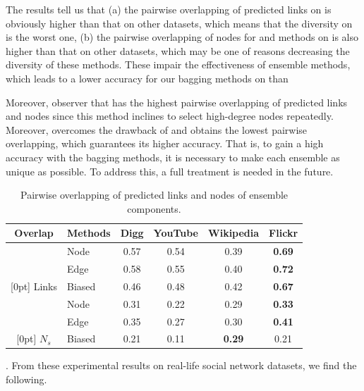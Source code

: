 The results tell us that (a) the pairwise overlapping of predicted links on \Flickr is
obviously higher than that on other datasets, which means that the diversity on \Flickr is the
worst one, (b) the pairwise overlapping of nodes for
\Node and \Edge methods on \Flickr is also higher than that on other datasets, which may be
one of reasons decreasing the diversity of these methods. These impair the effectiveness of ensemble methods,
which leads to a lower accuracy for our bagging methods on \Flickr than \NMF

Moreover, observer that \Edge has the highest
pairwise overlapping of predicted links and nodes since this method inclines to select high-degree
nodes repeatedly. Moreover, \Biased overcomes the drawback of \Edge and obtains the lowest pairwise
overlapping, which guarantees its higher accuracy. That is, to gain a high accuracy with the bagging methods, it
is necessary to make each ensemble as unique as possible. To address this, a full treatment is needed in the future.




\begin{table}
\caption{Pairwise overlapping of predicted links and nodes of ensemble components.}
\label{tab_limitations}
\vspace{0ex}
\centering
\newcommand{\tabincell}[2]{\begin{tabular}{@{}#1@{}}#2\end{tabular}}
\begin{tabular}{c|l|c|c|c|c}
\hline \hline Overlap & Methods & Digg & YouTube & Wikipedia & Flickr \\
\hline \hline
& Node & 0.57 & 0.54 & 0.39 & \textbf{0.69} \\
& Edge & 0.58 & 0.55 & 0.40 & \textbf{0.72} \\
\raisebox{2.5ex}[0pt]{ Links } & Biased & 0.46 & 0.48 & 0.42 & \textbf{0.67} \\
\hline
& Node & 0.31 & 0.22 & 0.29 & \textbf{0.33} \\
& Edge & 0.35 & 0.27 & 0.30 & \textbf{0.41} \\
\raisebox{2.5ex}[0pt]{ $N_s$ } & Biased & 0.21 & 0.11 & \textbf{0.29} & 0.21 \\
\hline \hline
\end{tabular}
\vspace{-2ex}
\end{table}




. From these experimental results on real-life social network datasets,
we find the following. 

